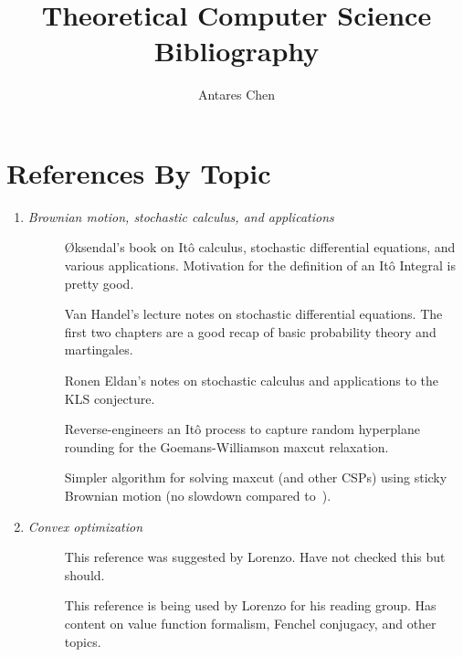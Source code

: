 \documentclass{article}
\title{Theoretical Computer Science Bibliography}
\author{Antares Chen}
\theoremstyle{definition}
\begin{document}
\maketitle



\section{References By Topic}

\begin{enumerate}[--]

\item \emph{Brownian motion, stochastic calculus, and applications}
\begin{description}
\item[\cite{Oks13}] {{\O}}ksendal's book on It\^{o} calculus, stochastic differential equations, and various applications. Motivation for the definition of an It\^{o} Integral is pretty good.

\item[\cite{VH07}] Van Handel's lecture notes on stochastic differential equations. The first two chapters are a good recap of basic probability theory and martingales.

\item[\cite{Eld20}] Ronen Eldan's notes on stochastic calculus and applications to the KLS conjecture.

\item[\cite{EN19}] Reverse-engineers an It\^{o} process to capture random hyperplane rounding for the Goemans-Williamson maxcut relaxation.

\item[\cite{AZBG+20}] Simpler algorithm for solving maxcut (and other CSPs) using sticky Brownian motion (no slowdown compared to~\cite{EN19}).
\end{description}


\item \emph{Convex optimization}
\begin{description}
\item[\cite{BNO03}] This reference was suggested by Lorenzo. Have not checked this but should.

\item[\cite{Bor10}] This reference is being used by Lorenzo for his reading group. Has content on value function formalism, Fenchel conjugacy, and other topics.


\end{description}
\end{enumerate}
\end{document}
